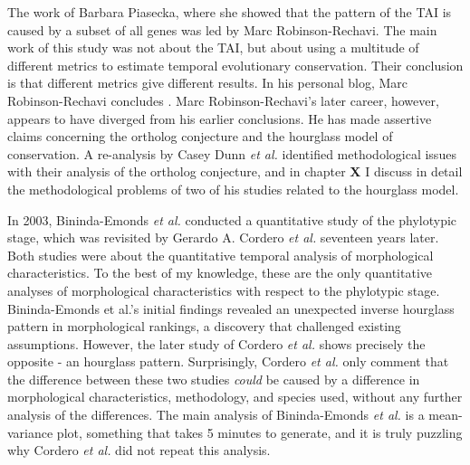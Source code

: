 The work of Barbara Piasecka, where she showed that the pattern of the TAI is caused by a subset of all genes was led by Marc Robinson-Rechavi. The main work of this study was not about the TAI, but about using a multitude of different metrics to estimate temporal evolutionary conservation. Their conclusion is that different metrics give different results. In his personal blog, Marc Robinson-Rechavi concludes \cite{robinsonrechaviblog}. Marc Robinson-Rechavi's later career, however, appears to have diverged from his earlier conclusions. He has made assertive claims concerning the ortholog conjecture\cite{KryuchkovaMostacci2016} and the hourglass model of conservation\cite{Liu2020,Liu2021,marletaz2018}. A re-analysis by Casey Dunn \textit{et al.} identified methodological issues with their analysis of the ortholog conjecture\cite{Dunn2018}, and in chapter \textbf{X} I discuss in detail the methodological problems of two of his studies related to the hourglass model.

In 2003, Bininda-Emonds \textit{et al.} conducted a quantitative study of the phylotypic stage, which was revisited by Gerardo A. Cordero \textit{et al.} seventeen years later\cite{OlafRP2003, Cordero2020}. Both studies were about the quantitative temporal analysis of morphological characteristics. To the best of my knowledge, these are the only quantitative analyses of morphological characteristics with respect to the phylotypic stage. Bininda-Emonds et al.'s initial findings revealed an unexpected inverse hourglass pattern in morphological rankings, a discovery that challenged existing assumptions. However, the later study of Cordero \textit{et al.} shows precisely the opposite - an hourglass pattern. Surprisingly, Cordero \textit{et al.} only comment that the difference between these two studies \textit{could} be caused by a difference in morphological characteristics, methodology, and species used, without any further analysis of the differences. The main analysis of Bininda-Emonds \textit{et al.} is a mean-variance plot, something that takes 5 minutes to generate, and it is truly puzzling why Cordero \textit{et al.} did not repeat this analysis.

